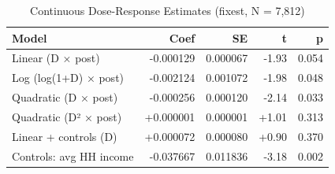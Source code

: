 \begin{table}[ht]
\centering
\begin{tabular}{lrrrr}
  \toprule
Model & Coef & SE & t & p \\ 
  \midrule
Linear (D × post) & -0.000129 & 0.000067 & -1.93 & 0.054 \\ 
  Log (log(1+D) × post) & -0.002124 & 0.001072 & -1.98 & 0.048 \\ 
  Quadratic (D × post) & -0.000256 & 0.000120 & -2.14 & 0.033 \\ 
  Quadratic (D² × post) & +0.000001 & 0.000001 & +1.01 & 0.313 \\ 
  Linear + controls (D) & +0.000072 & 0.000080 & +0.90 & 0.370 \\ 
  Controls: avg HH income & -0.037667 & 0.011836 & -3.18 & 0.002 \\ 
   \bottomrule
\end{tabular}
\caption{Continuous Dose-Response Estimates (fixest, N = 7,812)} 
\label{tab:continuous}
\end{table}
